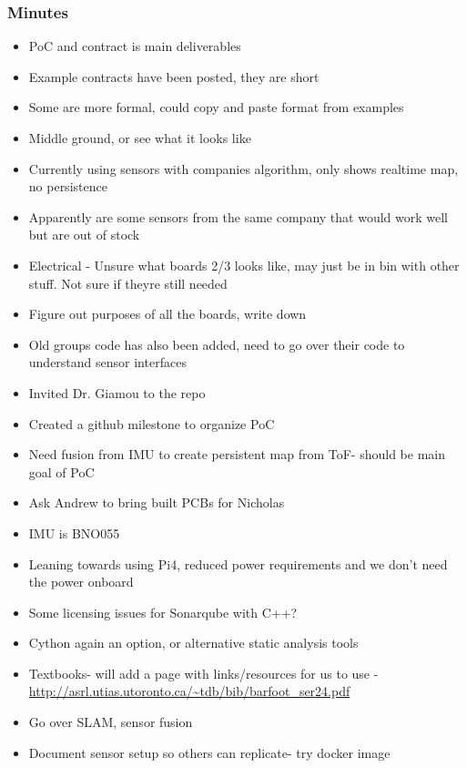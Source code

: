 	\subsubsection*{Minutes}
		\begin{itemize}
			\item PoC and contract is main deliverables
			\item Example contracts have been posted, they are short
			\item Some are more formal, could copy and paste format from examples
			\item Middle ground, or see what it looks like
			\item Currently using sensors with companies algorithm, only shows realtime map, no persistence
			\item Apparently are some sensors from the same company that would work well but are out of stock
			\item Electrical - Unsure what boards 2/3 looks like, may just be in bin with other stuff. Not sure if theyre still needed
			\item Figure out purposes of all the boards, write down
			\item Old groups code has also been added, need to go over their code to understand sensor interfaces
			\item Invited Dr. Giamou to the repo
			\item Created a github milestone to organize PoC
			\item Need fusion from IMU to create persistent map from ToF- should be main goal of PoC
			\item Ask Andrew to bring built PCBs for Nicholas
			\item IMU is BNO055
			\item Leaning towards using Pi4, reduced power requirements and we don't need the power onboard
			\item Some licensing issues for Sonarqube with C++?
			\item Cython again an option, or alternative static analysis tools
			\item Textbooks- will add a page with links/resources for us to use - \url{http://asrl.utias.utoronto.ca/~tdb/bib/barfoot_ser24.pdf}
			\item Go over SLAM, sensor fusion 
			\item Document sensor setup so others can replicate- try docker image
		\end{itemize}

